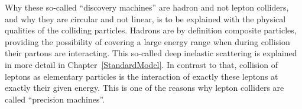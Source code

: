 Why these so-called ``discovery machines'' are hadron and not lepton colliders, and why they are circular and not linear, is to be explained with the physical qualities of the colliding particles.
Hadrons are by definition composite particles, providing the possibility of covering a large energy range when during collision their partons are interacting.
This so-called deep inelastic scattering is explained in more detail in Chapter~\ref{StandardModel}.
In contrast to that, collision of leptons as elementary particles is the interaction of exactly these leptons at exactly their given energy.
This is one of the reasons why lepton colliders are called ``precision machines''.